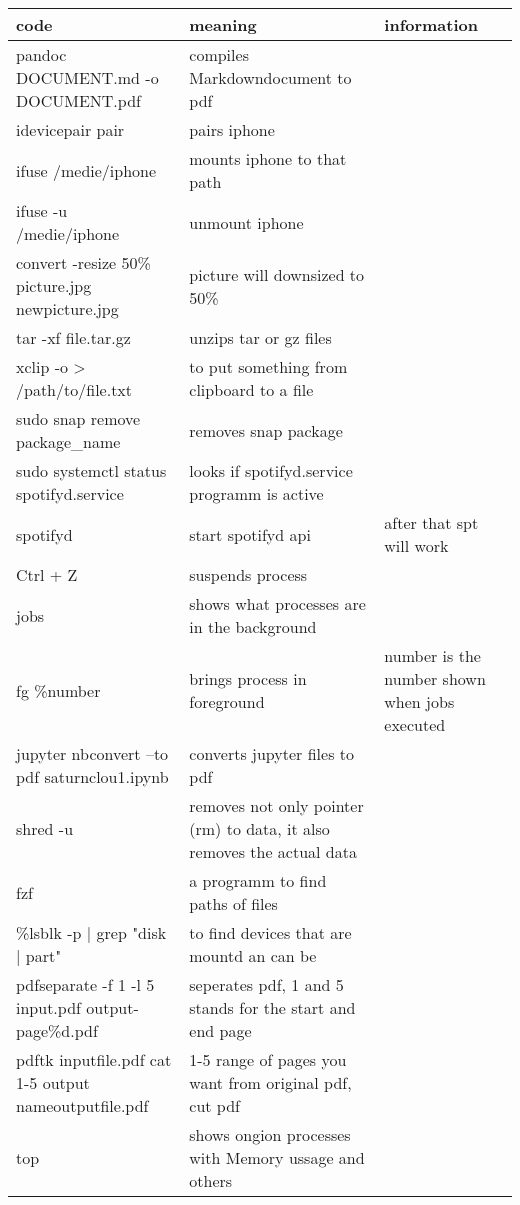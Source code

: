 \documentclass[12pt]{article}
\begin{document}
\begin{tabular}{| p{6.5cm} | p{6.5cm} | p{6.5cm} |}
    \hline
    code & meaning & information\\
    \hline 
    pandoc DOCUMENT.md -o DOCUMENT.pdf & compiles Markdowndocument to pdf & \\
    \hline
    idevicepair pair & pairs iphone &\\
    \hline
    ifuse /medie/iphone & mounts iphone to that path &\\
    \hline
    ifuse -u /medie/iphone & unmount iphone & \\
    \hline 
    convert -resize 50\% picture.jpg newpicture.jpg & picture will downsized to 50\% &\\
    \hline
    tar -xf file.tar.gz & unzips tar or gz files &\\
    \hline
    xclip -o > /path/to/file.txt & to put something from clipboard to a file &\\
    \hline 
    sudo snap remove package\_name & removes snap package &\\
    \hline
    sudo systemctl status spotifyd.service  & looks if spotifyd.service programm is active &\\
    \hline 
    spotifyd & start spotifyd api & after that spt will work \\
    \hline
    Ctrl + Z & suspends process & \\
    \hline 
    jobs & shows what processes are in the background & \\
    \hline
    fg \%number & brings process in foreground & number is the number shown when jobs executed \\
    \hline
    jupyter nbconvert --to pdf saturnclou1.ipynb & converts jupyter files to pdf & \\
    \hline 
    shred -u & removes not only pointer (rm) to data, it also removes the actual data & \\
    \hline
    fzf & a programm to find paths of files & \\
    \hline 
    \%lsblk -p | grep "disk | part" & to find devices that are mountd an can be & \\
    \hline 
    pdfseparate -f 1 -l 5 input.pdf output-page\%d.pdf & seperates pdf, 1 and 5 stands for the start and end page & \\
    \hline
    pdftk inputfile.pdf cat 1-5 output nameoutputfile.pdf & 1-5 range of pages you want from original pdf, cut pdf & \\
    \hline
    top & shows ongion processes with Memory ussage and others & \\

\end{tabular}
\end{document}
